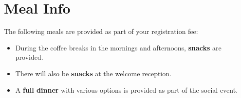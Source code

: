 \setheaders{}{}
\section{Meal Info}{}

The following meals are provided as part of your registration fee:

\begin{itemize}
\item During the coffee breaks in the mornings and afternoons, \textbf{snacks} are provided.
\item There will also be \textbf{snacks} at the welcome reception.
\item A \textbf{full dinner} with various options is provided as part of the social event.
\end{itemize}